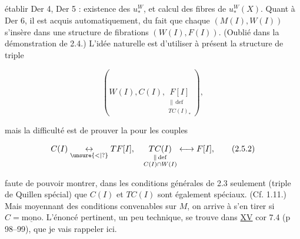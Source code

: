 
 établir Der 4, Der 5 : existence des $u_*^W$, et
calcul des fibres de $u_*^W(X)$. Quant à Der 6,
il est acquis automatiquement, du fait
que chaque $(M(I),W(I))$ s'insère dans une
structure de fibrations $(W(I),F(I))$. (Oublié
dans la démonstration de 2.4.) L'idée naturelle
est d'utiliser à présent la structure de
triple

\[
 \left(W(I),C(I),\underset{\substack{\|\,\mathrm{def}\\ TC(I)_{*}}}{F[I]}\right),\tag*{(2.5.1)}
\]

mais la difficulté est de prouver la 
pour les couples

\[
 C(I)\underset{\unsure{<|?}}{\leftrightarrow}TF[I],\quad
 \underset{\substack{\|\,\mathrm{def}\\ C(I)\cap W(I)}}{TC(I)}\longleftrightarrow F[I],\tag*{(2.5.2)}
\]

faute de pouvoir montrer, dans les conditions
générales de 2.3 seulement (triple de Quillen
spécial) que $C(I)$ et $TC(I)$ sont également
spéciaux. (Cf.  1.11.) Mais
moyennant des conditions convenables sur
$M$, on arrive à s'en tirer si $C=\underline{\mathrm{mono}}$.
L'énoncé pertinent, un peu technique, se
trouve dans \uline{XV} cor 7.4 (p 98--99), que je
vais rappeler ici.
